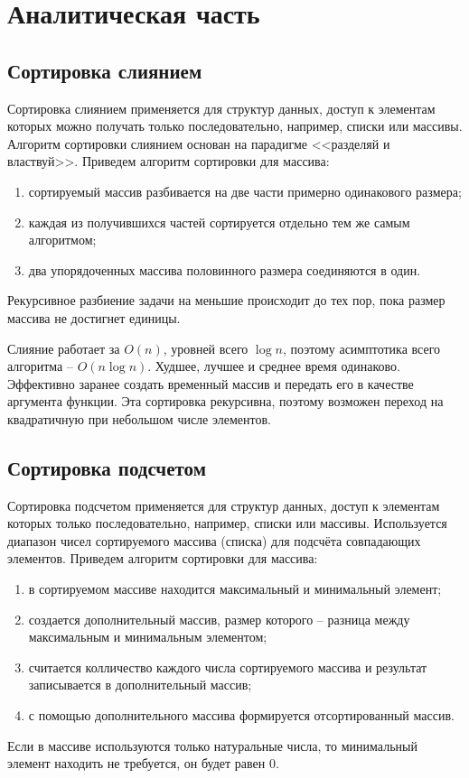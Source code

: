 \chapter{Аналитическая часть}

\section{Сортировка слиянием}

Сортировка слиянием применяется для структур данных, доступ к элементам которых можно получать только последовательно, например, списки или массивы. Алгоритм сортировки слиянием основан на парадигме <<разделяй и властвуй>>. Приведем алгоритм сортировки для массива:
\begin{enumerate}
	\item сортируемый массив разбивается на две части примерно одинакового размера;
	\item каждая из получившихся частей сортируется отдельно тем же самым алгоритмом; 
	\item два упорядоченных массива половинного размера соединяются в один.
\end{enumerate}
Рекурсивное разбиение задачи на меньшие происходит до тех пор, пока размер массива не достигнет единицы.

Слияние работает за $O(n)$, уровней всего $\log n$, поэтому асимптотика всего алгоритма -- $O(n\log n)$. Худшее, лучшее и среднее время одинаково. Эффективно заранее создать временный массив и передать его в качестве аргумента функции. Эта сортировка рекурсивна, поэтому возможен переход на квадратичную при небольшом числе элементов.


\section{Сортировка подсчетом}

Сортировка подсчетом применяется для структур данных, доступ к элементам которых только последовательно, например, списки или массивы. Используется диапазон чисел сортируемого массива (списка) для подсчёта совпадающих элементов. Приведем алгоритм сортировки для массива:
\begin{enumerate}
	\item в сортируемом массиве находится максимальный и минимальный элемент;
	\item создается дополнительный массив, размер которого -- разница между максимальным и минимальным элементом;
	\item считается колличество каждого числа сортируемого массива и результат записывается в дополнительный массив;
	\item с помощью дополнительного массива формируется отсортированный массив.
\end{enumerate}
Если в массиве используются только натуральные числа, то минимальный элемент находить не требуется, он будет равен 0.


